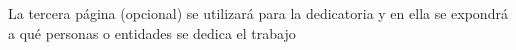 \dedication

\parskip 10pt  \setlength{\parindent}{0pc}

La tercera página (opcional) se utilizará para la dedicatoria y en ella se expondrá a qué personas o
entidades se dedica el trabajo